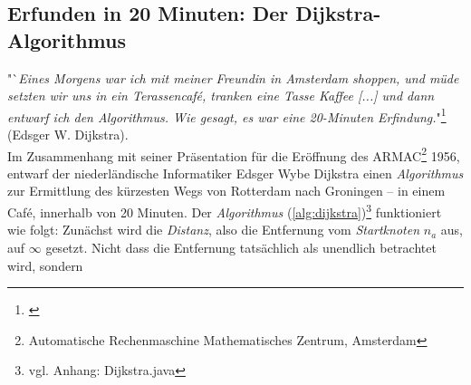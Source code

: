 \documentclass[12pt]{article}
\begin{document}
\subsection{Erfunden in 20 Minuten: Der Dijkstra-Algorithmus}
\label{sec:dijk}
"`{\em Eines Morgens war ich mit meiner Freundin in Amsterdam shoppen, und müde setzten wir uns in ein Terassencafé, tranken eine Tasse Kaffee [...] und dann entwarf ich den Algorithmus. Wie gesagt, es war eine 20-Minuten Erfindung.}"\footnote{\cite[(engl.), S. 42f]{interview}} (Edsger W. Dijkstra).
\\
Im Zusammenhang mit seiner Präsentation für die Eröffnung des ARMAC\footnote{Automatische Rechenmaschine Mathematisches Zentrum, Amsterdam} 1956, entwarf der niederländische Informatiker Edsger Wybe Dijkstra einen \textit{Algorithmus} zur Ermittlung des kürzesten Wegs von Rotterdam nach Groningen -- in einem Café, innerhalb von 20 Minuten. Der \textit{Algorithmus} (\autoref{alg:dijkstra})\footnote{vgl. Anhang: Dijkstra.java} funktioniert wie folgt:
\newpage
\noindent Zunächst wird die \textit{Distanz}, also die Entfernung vom \textit{Startknoten} $n_a$ aus, auf $\infty$ gesetzt. Nicht dass die Entfernung tatsächlich als unendlich betrachtet wird, sondern 
\end{document}
